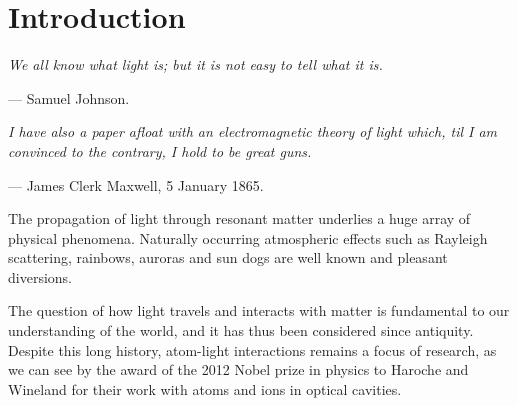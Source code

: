\chapter[Introduction]
  {Introduction}
  \label{chp:intro}

  \begin{displayquote}
    \textit{
    We all \textrm{know} what light is; but it is not easy to \textrm{tell} what
    it is.
    }
    \begin{flushright}
      --- Samuel Johnson.
    \end{flushright}
  \end{displayquote} 

  \begin{displayquote}
  \textit{
  I have also a paper afloat with an electromagnetic theory of light which, til
  I am convinced to the contrary, I hold to be great guns.
  }\\
    \begin{flushright}
      --- James Clerk Maxwell, 5 January 1865.
    \end{flushright}
  \end{displayquote}


    The propagation of light through resonant matter underlies a huge array of
    physical phenomena. Naturally occurring atmospheric effects such as Rayleigh
    scattering, rainbows, auroras and sun dogs are well known and pleasant
    diversions.


    The question of how light travels and interacts with matter is fundamental
    to our understanding of the world, and it has thus been considered since
    antiquity. Despite this long history, atom-light interactions remains a
    focus of research, as we can see by the award of the 2012 Nobel prize in
    physics to Haroche and Wineland for their work with atoms and ions in
    optical cavities.\cite{Nobelprize.org}

